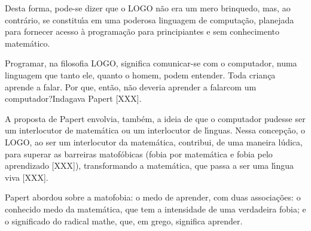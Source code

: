 \documentclass[
12pt,		%
openright,	%
twoside,  %
a4paper,			%
chapter=TITLE,		%
english,			%
french,				%
spanish,			%
brazil				%
]{USPSC-classe/USPSC}
\begin{document}
Desta forma, pode-se dizer que o LOGO n\~ao era um mero brinquedo, mas, ao contr\'ario, se constitu\'{\i}a em uma poderosa linguagem de computa\c{c}\~ao, planejada para fornecer acesso \`a programa\c{c}\~ao para principiantes e sem conhecimento matem\'atico.














Programar, na filosofia LOGO, significa \textquotedbl comunicar-se com o computador, numa linguagem que tanto ele, quanto o homem,  podem entender\textquotedbl . Toda crian\c{c}a aprende a falar. Por que, ent\~ao, n\~ao deveria aprender a \textquotedbl falar\textquotedbl  com um computador?\textquotedbl  Indagava Papert [XXX].














A proposta de Papert envolvia, tamb\'em, a ideia de que o computador pudesse ser um interlocutor  de matem\'atica ou um interlocutor de l\'{\i}nguas. Nessa concep\c{c}\~ao, o LOGO, ao ser um interlocutor da matem\'atica, contribui, de uma maneira l\'udica, para superar as barreiras matof\'obicas (fobia por matem\'atica e fobia pelo aprendizado [XXX]), transformando a matem\'atica, que passa a ser uma l\'{\i}ngua viva [XXX].














Papert abordou sobre a \textquotedbl matofobia: o medo de aprender\textquotedbl , com duas associa\c{c}\~oes: o conhecido medo da matem\'atica, que tem a intensidade de uma verdadeira fobia; e o  significado do radical mathe, que, em grego, significa aprender.
\end{document}
